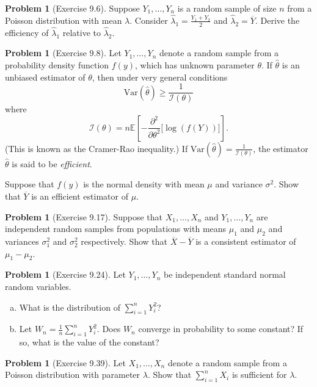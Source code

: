 \documentclass[10pt]{article}
\theoremstyle{definition}
\newtheorem{problem}[theorem]{Problem}
\newcommand{\1}[1]{\textbf{1}_{\left[#1\right]}} %
\def\E{\mathbb{E}} %
\def\Var{\mathrm{Var}} %
\begin{document}
\begin{problem}[Exercise 9.6]
  Suppose $Y_{1},\ldots,Y_{n}$ is a random sample of size $n$ from a Poisson
  distribution with mean $\lambda$. Consider
  $\widehat{\lambda}_{1}= \frac{Y_{1}+Y_{2}}{2}$ and
  $\widehat{\lambda}_{2}=\overline{Y}$. Derive the efficiency of
  $\widehat{\lambda}_{1}$ relative to $\widehat{\lambda}_{2}$.
\end{problem}

\begin{problem}[Exercise 9.8]
  Let  $Y_{1},\ldots,Y_{n}$ denote a random sample from a probability density
  function $f(y)$, which has unknown parameter $\theta$. If $\widehat{\theta}$
  is an unbiased estimator of $\theta$, then under very general conditions
  \begin{equation*}
    \Var(\widehat{\theta}) \geq \frac{1}{\mathcal{I}(\theta)}
  \end{equation*}
  where
  \begin{equation*}
    \mathcal{I}(\theta)= n \E\left[- \frac{\partial^{2}}{\partial \theta^{2} }\Big[\log(f(Y)) \Big]  \right].
  \end{equation*}
  (This is known as the Cramer-Rao inequality.) If
  $\Var(\widehat{\theta})=\frac{1}{\mathcal{I}(\theta)}$, the estimator
  $\widehat{\theta}$ is said to be \textit{efficient}.

  Suppose that $f(y)$ is the normal density with mean $\mu$ and variance
  $\sigma^{2}$. Show that $\overline{Y}$ is an efficient estimator of $\mu$.
\end{problem}

\begin{problem}[Exercise 9.17]
  Suppose that $X_{1},\ldots,X_{n}$ and $Y_{1},\ldots,Y_{n}$ are independent
  random samples from populations with means $\mu_{1}$ and $\mu_{2}$ and
  variances $\sigma^{2}_{1}$ and $\sigma_{2}^{2}$ respectively. Show that
  $\overline{X}-\overline{Y}$ is a consistent estimator of $\mu_{1}-\mu_{2}$.
\end{problem}

\begin{problem}[Exercise 9.24]
  Let $Y_{1},\ldots,Y_{n}$ be independent standard normal random variables.
  \begin{enumerate}[(a)]
    \item What is the distribution of $\sum_{i=1}^{n} Y_{i}^{2}$?
    \item Let $W_{n}= \frac{1}{n} \sum_{i=1}^{n} Y_{i}^{2}$. Does $W_{n}$
    converge in probability to some constant? If so, what is the value of the
    constant?
  \end{enumerate}
\end{problem}


\begin{problem}[Exercise 9.39]
  Let $X_{1},\ldots,X_{n}$ denote a random sample from a Poisson distribution
  with parameter $\lambda$.  Show that $\sum_{i=1}^{n} X_{i}$ is sufficient
  for $\lambda$. 
\end{problem}
\end{document}
